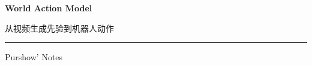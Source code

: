 \documentclass[11pt,a4paper,fontset=none]{ctexart}
\begin{document}
\begin{titlepage}
  \centering
  \vspace*{0.20\textheight}
  {\Huge\bfseries\sffamily\color{wamblue} World Action Model\par}
  \vspace{1.2em}
  {\LARGE\sffamily 从视频生成先验到机器人动作\par}
  \vspace{2.2em}
  {\color{wamgray}\rule{0.54\textwidth}{0.6pt}\par}
  \vfill
  {\large\sffamily Purshow' Notes\par}
  \vspace*{0.10\textheight}
\end{titlepage}

\tableofcontents
\clearpage

\end{document}
